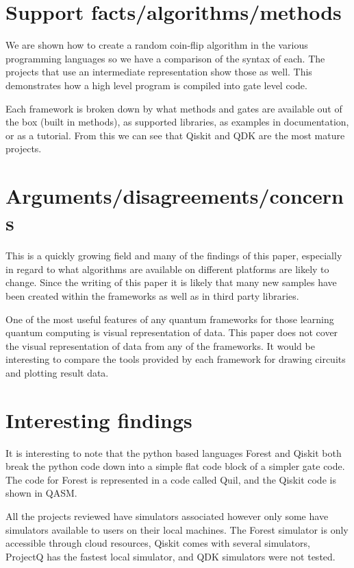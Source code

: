 \documentclass{article}
\begin{document}
\section{Support facts/algorithms/methods}
We are shown how to create a random coin-flip algorithm in the various programming languages so we have a comparison of the syntax of each. The projects that use an intermediate representation show those as well. This demonstrates how a high level program is compiled into gate level code.

Each framework is broken down by what methods and gates are available out of the box (built in methods), as supported libraries, as examples in documentation, or as a tutorial. From this we can see that Qiskit and QDK are the most mature projects.  

\section{Arguments/disagreements/concerns}

This is a quickly growing field and many of the findings of this paper, especially in regard to what algorithms are available on different platforms are likely to change. Since the writing of this paper it is likely that many new samples have been created within the frameworks as well as in third party libraries.

One of the most useful features of any quantum frameworks for those learning quantum computing is visual representation of data. This paper does not cover the visual representation of data from any of the frameworks. It would be interesting to compare the tools provided by each framework for drawing circuits and plotting result data.


\section{Interesting findings}
It is interesting to note that the python based languages Forest and Qiskit both break the python code down into a simple flat code block of a simpler gate code. The code for Forest is represented in a code called Quil, and the Qiskit code is shown in QASM.

All the projects reviewed have simulators associated however only some have simulators available to users on their local machines. The Forest simulator is only accessible through cloud resources, Qiskit comes with several simulators, ProjectQ has the fastest local simulator, and QDK simulators were not tested.
\end{document}
